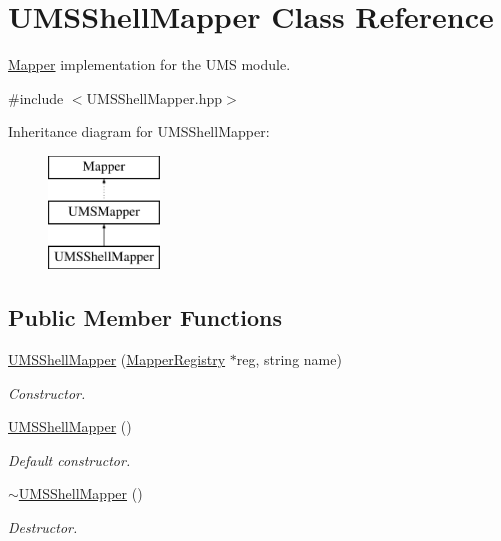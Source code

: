 \hypertarget{classUMSShellMapper}{
\section{UMSShellMapper Class Reference}
\label{classUMSShellMapper}
}


\hyperlink{classMapper}{Mapper} implementation for the UMS module.  




{\ttfamily \#include $<$UMSShellMapper.hpp$>$}

Inheritance diagram for UMSShellMapper:\begin{figure}[H]
\begin{center}
\leavevmode
\includegraphics[height=3.000000cm]{classUMSShellMapper}
\end{center}
\end{figure}
\subsection*{Public Member Functions}
\begin{DoxyCompactItemize}
\item 
\hyperlink{classUMSShellMapper_a2b59b801c865e338b3dbcc752ede9fd4}{UMSShellMapper} (\hyperlink{classMapperRegistry}{MapperRegistry} $\ast$reg, string name)
\begin{DoxyCompactList}\small\item\em Constructor. \item\end{DoxyCompactList}\item 
\hypertarget{classUMSShellMapper_a11cc933f8a528a0c9993011ca24b2722}{
\hyperlink{classUMSShellMapper_a11cc933f8a528a0c9993011ca24b2722}{UMSShellMapper} ()}
\label{classUMSShellMapper_a11cc933f8a528a0c9993011ca24b2722}

\begin{DoxyCompactList}\small\item\em Default constructor. \item\end{DoxyCompactList}\item 
\hypertarget{classUMSShellMapper_af359df669f4205b4057d00b21e99f5cd}{
\hyperlink{classUMSShellMapper_af359df669f4205b4057d00b21e99f5cd}{$\sim$UMSShellMapper} ()}
\label{classUMSShellMapper_af359df669f4205b4057d00b21e99f5cd}

\begin{DoxyCompactList}\small\item\em Destructor. \item\end{DoxyCompactList}\end{DoxyCompactItemize}


